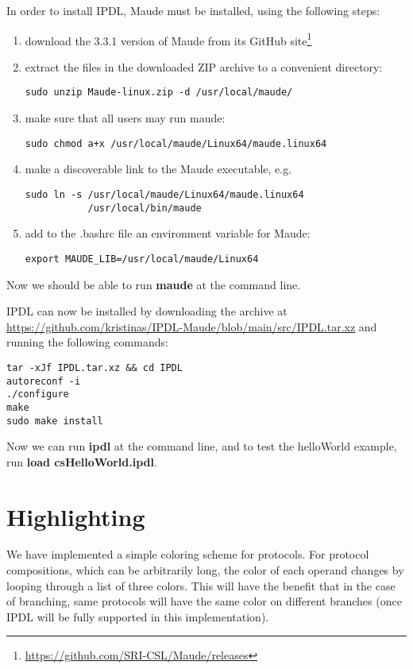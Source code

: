 \documentclass{article}
\begin{document}
In order to install IPDL, Maude must be installed, using the following steps:
\begin{enumerate}
\item download the 3.3.1 version of Maude from its GitHub site\footnote{
\url{https://github.com/SRI-CSL/Maude/releases} }
\item extract the files in the downloaded ZIP archive to a convenient directory:
\begin{lstlisting}
sudo unzip Maude-linux.zip -d /usr/local/maude/
\end{lstlisting}
\item make sure that all users may run maude:
\begin{lstlisting}
sudo chmod a+x /usr/local/maude/Linux64/maude.linux64
\end{lstlisting}
\item make a discoverable link to the Maude executable, e.g.
\begin{lstlisting}
sudo ln -s /usr/local/maude/Linux64/maude.linux64
           /usr/local/bin/maude
\end{lstlisting}           
\item add to the .bashrc file an environment variable for Maude:
\begin{lstlisting}
export MAUDE_LIB=/usr/local/maude/Linux64
\end{lstlisting} 
\end{enumerate}

Now we should be able to run \textbf{maude} at the command line.

IPDL can now be installed by downloading the archive at \url{https://github.com/kristinas/IPDL-Maude/blob/main/src/IPDL.tar.xz}
and running the following commands:

\begin{lstlisting}
tar -xJf IPDL.tar.xz && cd IPDL
autoreconf -i
./configure
make
sudo make install 
\end{lstlisting}

Now we can run \textbf{ipdl} at the command line, and to test the
helloWorld example, run \textbf{load csHelloWorld.ipdl}.
 
\section{Highlighting}

We have implemented a simple coloring scheme for protocols.
For protocol compositions, which can be arbitrarily long, the color
of each operand changes by looping through a list of three colors. This
will have the benefit that in the case of branching, same protocols
will have the same color on different branches (once IPDL will be
fully supported in this implementation).
\end{document}
